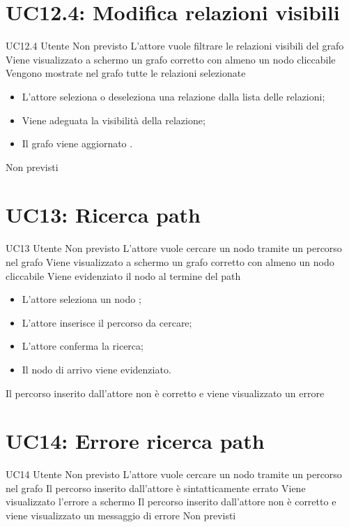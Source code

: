 \documentclass[../AnalisideiRequisiti.tex]{subfiles}
\begin{document}
	\section{UC12.4: Modifica relazioni visibili}
	\UserCase
	{UC12.4}
	{Utente}
	{Non previsto}
	{L'attore vuole filtrare le relazioni visibili del grafo}
	{Viene visualizzato a schermo un grafo corretto con almeno un nodo cliccabile }
	{Vengono mostrate nel grafo tutte le relazioni selezionate}
	{
		\begin{itemize}
			\item{} L'attore seleziona o deseleziona una relazione dalla lista delle relazioni;
			\item{} Viene adeguata la visibilità della relazione;
			\item{} Il grafo viene aggiornato .
		\end{itemize}
	}
	{Non previsti}
	
	\section{UC13: Ricerca path}
	\UserCase
	{UC13}
	{Utente}
	{Non previsto}
	{L'attore vuole cercare un nodo tramite un percorso nel grafo}
	{Viene visualizzato a schermo un grafo corretto con almeno un nodo cliccabile }
	{Viene evidenziato il nodo al termine del path}
	{
		\begin{itemize}
			\item{} L'attore seleziona un nodo ;
			\item{} L'attore inserisce il percorso da cercare;
			\item{} L'attore conferma la ricerca;
			\item{} Il nodo di arrivo viene evidenziato.
		\end{itemize}
	}
	{Il percorso inserito dall'attore non è corretto e viene visualizzato un errore }
	
	\section{UC14: Errore ricerca path}
	\UserCase
	{UC14}
	{Utente}
	{Non previsto}
	{L'attore vuole cercare un nodo tramite un percorso nel grafo}
	{Il percorso inserito dall'attore è sintatticamente errato}
	{Viene visualizzato l'errore a schermo }
	{Il percorso inserito dall'attore non è corretto e viene visualizzato un messaggio di errore}
	{Non previsti}
	
\end{document}
